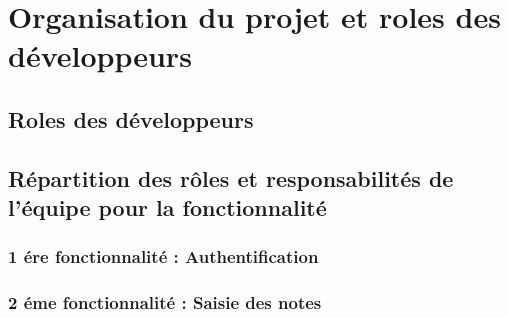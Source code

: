 \chapter{Organisation du projet et roles des développeurs}

\section{Roles des développeurs}
\section{Répartition des rôles et responsabilités de l'équipe pour la fonctionnalité}
\subsection{1 ére fonctionnalité : Authentification}
\subsection{2 éme fonctionnalité : Saisie des notes}











